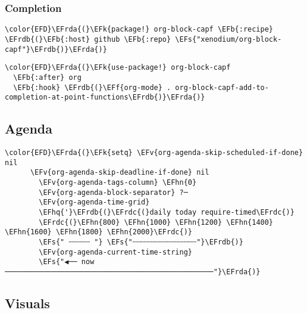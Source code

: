 \documentclass[12pt]{article}
\theoremstyle{plain}%
\theoremstyle{definition}
\theoremstyle{remark}
\newcommand{\EFs}[1]{\textcolor{EFs}{#1}} %
\newcommand{\EFk}[1]{\textcolor{EFk}{#1}} %
\newcommand{\EFb}[1]{\textcolor{EFb}{#1}} %
\newcommand{\EFf}[1]{\textcolor{EFf}{#1}} %
\newcommand{\EFv}[1]{\textcolor{EFv}{#1}} %
\newcommand{\EFhn}[1]{\textcolor{EFhn}{\textbf{#1}}} %
\newcommand{\EFhq}[1]{\textcolor{EFhq}{#1}} %
\newcommand{\EFrda}[1]{\textcolor{EFrda}{#1}} %
\newcommand{\EFrdb}[1]{\textcolor{EFrdb}{#1}} %
\newcommand{\EFrdc}[1]{\textcolor{EFrdc}{#1}} %
\begin{document}
\subsubsection{Completion}
\label{sec:org33d9927}
\begin{Code}
\begin{Verbatim}
\color{EFD}\EFrda{(}\EFk{package!} org-block-capf \EFb{:recipe} \EFrdb{(}\EFb{:host} github \EFb{:repo} \EFs{"xenodium/org-block-capf"}\EFrdb{)}\EFrda{)}
\end{Verbatim}
\end{Code}
\begin{Code}
\begin{Verbatim}
\color{EFD}\EFrda{(}\EFk{use-package!} org-block-capf
  \EFb{:after} org
  \EFb{:hook} \EFrdb{(}\EFf{org-mode} . org-block-capf-add-to-completion-at-point-functions\EFrdb{)}\EFrda{)}
\end{Verbatim}
\end{Code}
\subsection{Agenda}
\label{sec:org47c3bd0}
\begin{Code}
\begin{Verbatim}
\color{EFD}\EFrda{(}\EFk{setq} \EFv{org-agenda-skip-scheduled-if-done} nil
      \EFv{org-agenda-skip-deadline-if-done} nil
        \EFv{org-agenda-tags-column} \EFhn{0}
        \EFv{org-agenda-block-separator} ?─
        \EFv{org-agenda-time-grid}
        \EFhq{'}\EFrdb{(}\EFrdc{(}daily today require-timed\EFrdc{)}
        \EFrdc{(}\EFhn{800} \EFhn{1000} \EFhn{1200} \EFhn{1400} \EFhn{1600} \EFhn{1800} \EFhn{2000}\EFrdc{)}
        \EFs{" ┄┄┄┄┄ "} \EFs{"┄┄┄┄┄┄┄┄┄┄┄┄┄┄┄"}\EFrdb{)}
        \EFv{org-agenda-current-time-string}
        \EFs{"◀── now ─────────────────────────────────────────────────"}\EFrda{)}
\end{Verbatim}
\end{Code}
\subsection{Visuals}
\label{sec:org88be19f}
\end{document}
